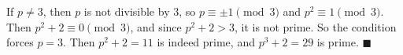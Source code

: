 If $p\ne3$, then $p$ is not divisible by $3$, so $p\equiv\pm1\pmod3$ and $p^2\equiv1\pmod3$. Then $p^2+2\equiv0\pmod3$, and since $p^2+2>3$, it is not prime. So the condition forces $p=3$. Then $p^2+2=11$ is indeed prime, and $p^3+2=29$ is prime. $\blacksquare$
